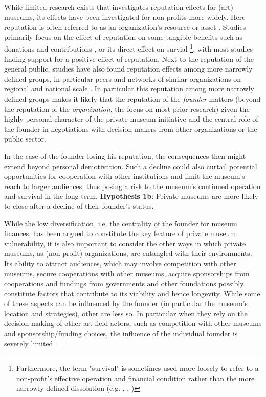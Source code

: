 \documentclass[12pt]{article}
\begin{document}
While limited research exists that investigates reputation effects for (art) museums, its effects have been investigated for non-profits more widely.
Here reputation is often referred to as an organization's resource or asset \parencite{Kong_Farrell_2010_image,Goldfarb_Zavyalova_Pillai_2018_Rao,Walker_McCarthy_2010_survival,Schloderer_Sarstedt_Ringle_2014_reputation}. 
Studies primarily focus on the effect of reputation on some tangible benefits such as donations and contributions \parencite{Sarstedt_2010_reputation,Mews_Boenigk_2012_blood,Heller_2008_alliances,Meijer_2009_reputation}, or its direct effect on survial \parencite{Lu_Shon_Zhang_2019_dissolution,Singh_1991_change,Hager_2001_vulnerability} \footnote{Furthermore, the term "survival" is sometimes used more loosely to refer to a non-profit's effective operation and financial condition rather than the more narrowly defined dissolution (e.g. \cite[p.58]{Santos_Laureano_Moro_2019_reputation}, \cite[p.15]{Heller_2008_alliances}, \cite[p.111]{Schloderer_Sarstedt_Ringle_2014_reputation})}, with most studies finding support for a positive effect of reputation.
Next to the reputation of the general public, studies have also found reputation effects among more narrowly defined groups, in particular peers \parencite{Padanyi_Gainer_2003_peerreputation} and networks of similar organizations on regional and national scale \parencite{Walker_McCarthy_2010_survival}.
In particular this reputation among more narrowly defined groups makes it likely that the reputation of the  \emph{founder} matters (beyond the reputation of the \emph{organization}, the focus on most prior research) given the highly personal character of the private museum initiative and the central role of the founder in negotiations with decision makers from other organizations or the public sector.


In the case of the founder losing his reputation, the consequences then might extend beyond personal demotivation.
Such a decline could also curtail potential opportunities for cooperation with other institutions and limit the museum's reach to larger audiences, thus posing a risk to the museum's continued operation and survival in the long term.
\textbf{Hypothesis 1b}: Private museums are more likely to close after a decline of their founder's status.



While the low diversification, i.e. the centrality of the founder for museum finances, has been argued to constitute the key feature of private museum vulnerability, it is also important to consider the other ways in which private museums, as (non-profit) organizations, are entangled with their environments.
Its ability to attract audiences, which may involve competition with other museums, secure cooperations with other museums, acquire sponsorships from cooperations and fundings from governments and other foundations possibly constitute factors that contribute to its viability and hence longevity.
While some of these aspects can be influenced by the founder (in particular the museum's location and strategies), other are less so.
In particular when they rely on the decision-making of other art-field actors, such as competition with other museums and sponsorship/funding choices, the influence of the individual founder is severely limited.
\end{document}
